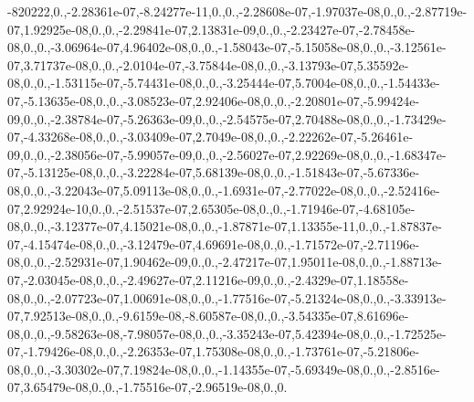 \begin{DoxyCompactItemize}
-820222,0.,-\/2.\-28361e-\/07,-\/8.\-24277e-\/11,0.,0.,-\/2.\-28608e-\/07,-\/1.\-97037e-\/08,0.,0.,-\/2.\-87719e-\/07,1.\-92925e-\/08,0.,0.,-\/2.\-29841e-\/07,2.\-13831e-\/09,0.,0.,-\/2.\-23427e-\/07,-\/2.\-78458e-\/08,0.,0.,-\/3.\-06964e-\/07,4.\-96402e-\/08,0.,0.,-\/1.\-58043e-\/07,-\/5.\-15058e-\/08,0.,0.,-\/3.\-12561e-\/07,3.\-71737e-\/08,0.,0.,-\/2.\-0104e-\/07,-\/3.\-75844e-\/08,0.,0.,-\/3.\-13793e-\/07,5.\-35592e-\/08,0.,0.,-\/1.\-53115e-\/07,-\/5.\-74431e-\/08,0.,0.,-\/3.\-25444e-\/07,5.\-7004e-\/08,0.,0.,-\/1.\-54433e-\/07,-\/5.\-13635e-\/08,0.,0.,-\/3.\-08523e-\/07,2.\-92406e-\/08,0.,0.,-\/2.\-20801e-\/07,-\/5.\-99424e-\/09,0.,0.,-\/2.\-38784e-\/07,-\/5.\-26363e-\/09,0.,0.,-\/2.\-54575e-\/07,2.\-70488e-\/08,0.,0.,-\/1.\-73429e-\/07,-\/4.\-33268e-\/08,0.,0.,-\/3.\-03409e-\/07,2.\-7049e-\/08,0.,0.,-\/2.\-22262e-\/07,-\/5.\-26461e-\/09,0.,0.,-\/2.\-38056e-\/07,-\/5.\-99057e-\/09,0.,0.,-\/2.\-56027e-\/07,2.\-92269e-\/08,0.,0.,-\/1.\-68347e-\/07,-\/5.\-13125e-\/08,0.,0.,-\/3.\-22284e-\/07,5.\-68139e-\/08,0.,0.,-\/1.\-51843e-\/07,-\/5.\-67336e-\/08,0.,0.,-\/3.\-22043e-\/07,5.\-09113e-\/08,0.,0.,-\/1.\-6931e-\/07,-\/2.\-77022e-\/08,0.,0.,-\/2.\-52416e-\/07,2.\-92924e-\/10,0.,0.,-\/2.\-51537e-\/07,2.\-65305e-\/08,0.,0.,-\/1.\-71946e-\/07,-\/4.\-68105e-\/08,0.,0.,-\/3.\-12377e-\/07,4.\-15021e-\/08,0.,0.,-\/1.\-87871e-\/07,1.\-13355e-\/11,0.,0.,-\/1.\-87837e-\/07,-\/4.\-15474e-\/08,0.,0.,-\/3.\-12479e-\/07,4.\-69691e-\/08,0.,0.,-\/1.\-71572e-\/07,-\/2.\-71196e-\/08,0.,0.,-\/2.\-52931e-\/07,1.\-90462e-\/09,0.,0.,-\/2.\-47217e-\/07,1.\-95011e-\/08,0.,0.,-\/1.\-88713e-\/07,-\/2.\-03045e-\/08,0.,0.,-\/2.\-49627e-\/07,2.\-11216e-\/09,0.,0.,-\/2.\-4329e-\/07,1.\-18558e-\/08,0.,0.,-\/2.\-07723e-\/07,1.\-00691e-\/08,0.,0.,-\/1.\-77516e-\/07,-\/5.\-21324e-\/08,0.,0.,-\/3.\-33913e-\/07,7.\-92513e-\/08,0.,0.,-\/9.\-6159e-\/08,-\/8.\-60587e-\/08,0.,0.,-\/3.\-54335e-\/07,8.\-61696e-\/08,0.,0.,-\/9.\-58263e-\/08,-\/7.\-98057e-\/08,0.,0.,-\/3.\-35243e-\/07,5.\-42394e-\/08,0.,0.,-\/1.\-72525e-\/07,-\/1.\-79426e-\/08,0.,0.,-\/2.\-26353e-\/07,1.\-75308e-\/08,0.,0.,-\/1.\-73761e-\/07,-\/5.\-21806e-\/08,0.,0.,-\/3.\-30302e-\/07,7.\-19824e-\/08,0.,0.,-\/1.\-14355e-\/07,-\/5.\-69349e-\/08,0.,0.,-\/2.\-8516e-\/07,3.\-65479e-\/08,0.,0.,-\/1.\-75516e-\/07,-\/2.\-96519e-\/08,0.,0.
\end{DoxyCompactItemize}
